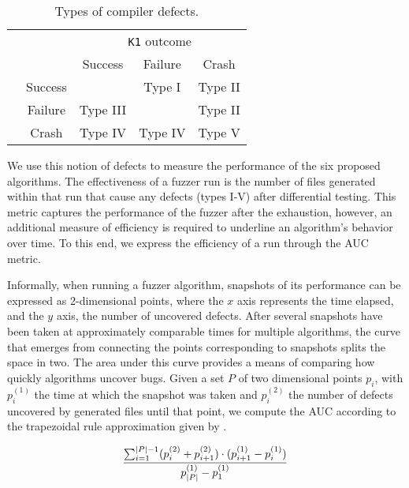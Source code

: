 \begin{table}[]
    \centering
    \begin{tabular}{cc|ccc}
        &&\multicolumn{3}{c}{\texttt{K1} outcome}\\
        &&Success & Failure & Crash\\
        \midrule
        \parbox[t]{2mm}{}& Success &  & Type I & Type II \\
        & Failure & Type III &  & Type II\\
        & Crash & Type IV & Type IV & Type V\\
    \end{tabular}
    \caption{Types of compiler defects.}
    \label{tab:defects}
\end{table}


We use this notion of defects to measure the
performance of the six proposed algorithms.
The effectiveness of a fuzzer run is the number
of files generated within that run that cause any defects (types I-V)
after differential testing.
This metric captures the performance of the fuzzer after the exhaustion,
however, an additional measure of efficiency is required to underline
an algorithm's behavior over time.
To this end, we express the efficiency of a run through the
\gls{AUC} metric.

Informally, when running a fuzzer algorithm, snapshots of its performance
can be expressed as 2-dimensional points, where the $x$ axis represents the time elapsed,
and the $y$ axis, the number of uncovered defects.
After several snapshots have been taken at approximately comparable
times for multiple algorithms, the curve that emerges from connecting the points
corresponding to snapshots splits the space in two.
The area under this curve provides a means of comparing how quickly
algorithms uncover bugs.
Given a set $P$ of two dimensional points $p_i$, with $p_i^{(1)}$
the time at which the snapshot was taken and $p_i^{(2)}$ the number of defects
uncovered by generated files until that point,
we compute the \gls{AUC} according to the trapezoidal rule approximation
given by .

\begin{equation}
    \frac{\sum_{i=1}^{\mid P \mid - 1} \Large( p_i^{(2)} + p_{i + 1}^{(2)} \Large)
\cdot (p_{i + 1}^{(1)} - p_{i}^{(1)})}{p_{\mid P \mid}^{(1)} - p_1^{(1)}}
\label{eq:auc}
\end{equation}


